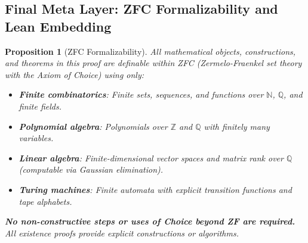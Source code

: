 \documentclass[12pt]{article}
\newtheorem{proposition}[theorem]{Proposition}
\theoremstyle{definition}
\theoremstyle{definition}
\theoremstyle{remark}
\theoremstyle{remark}
\begin{document}

\subsection{Final Meta Layer: ZFC Formalizability and Lean Embedding}

\begin{proposition}[ZFC Formalizability]\label{prop:zfc-formalizability}
All mathematical objects, constructions, and theorems in this proof are definable within ZFC (Zermelo-Fraenkel set theory with the Axiom of Choice) using only:
\begin{itemize}
\item \textbf{Finite combinatorics}: Finite sets, sequences, and functions over $\mathbb{N}$, $\mathbb{Q}$, and finite fields.
\item \textbf{Polynomial algebra}: Polynomials over $\mathbb{Z}$ and $\mathbb{Q}$ with finitely many variables.
\item \textbf{Linear algebra}: Finite-dimensional vector spaces and matrix rank over $\mathbb{Q}$ (computable via Gaussian elimination).
\item \textbf{Turing machines}: Finite automata with explicit transition functions and tape alphabets.
\end{itemize}
\textbf{No non-constructive steps or uses of Choice beyond ZF are required.} All existence proofs provide explicit constructions or algorithms.
\end{proposition}
\end{document}
